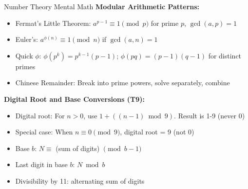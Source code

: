 \documentclass{article}
\begin{document}
\begin{mentalbox}{Number Theory Mental Math}
\textbf{Modular Arithmetic Patterns:}
\begin{itemize}[nosep]
\item Fermat's Little Theorem: $a^{p-1} \equiv 1 \pmod{p}$ for prime $p$, $\gcd(a,p)=1$
\item Euler's: $a^{\phi(n)} \equiv 1 \pmod{n}$ if $\gcd(a,n)=1$
\item Quick $\phi$: $\phi(p^k) = p^{k-1}(p-1)$; $\phi(pq) = (p-1)(q-1)$ for distinct primes
\item Chinese Remainder: Break into prime powers, solve separately, combine
\end{itemize}

\textbf{Digital Root and Base Conversions (T9):}
\begin{itemize}[nosep]
\item Digital root: For $n > 0$, use $1 + ((n-1) \bmod 9)$. Result is 1-9 (never 0)
\item Special case: When $n \equiv 0 \pmod{9}$, digital root = 9 (not 0)
\item Base $b$: $N \equiv$ (sum of digits) $\pmod{b-1}$
\item Last digit in base $b$: $N \bmod b$
\item Divisibility by 11: alternating sum of digits
\end{itemize}
\end{mentalbox}
\end{document}
